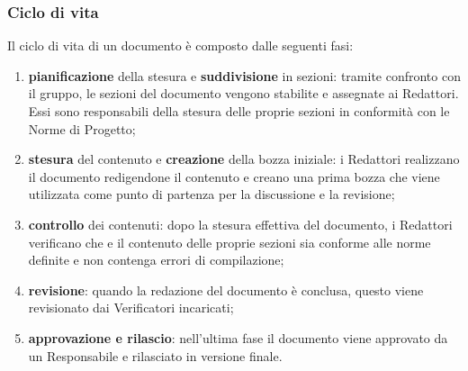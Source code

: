 \subsubsection{Ciclo di vita}
Il ciclo di vita di un documento è composto dalle seguenti fasi:
\begin{enumerate}
	\item \textbf{pianificazione} della stesura e \textbf{suddivisione} in sezioni: tramite confronto con il gruppo, le sezioni del documento vengono stabilite e assegnate ai Redattori. Essi sono responsabili della stesura delle proprie sezioni in conformità con le Norme di Progetto;
	\item \textbf{stesura} del contenuto e \textbf{creazione} della bozza iniziale: i Redattori realizzano il documento redigendone il contenuto e creano una prima bozza che viene utilizzata come punto di partenza per la discussione e la revisione;
	\item \textbf{controllo} dei contenuti: dopo la stesura effettiva del documento, i Redattori verificano che e il contenuto delle proprie sezioni sia conforme alle norme definite e non contenga errori di compilazione;
	\item \textbf{revisione}: quando la redazione del documento è conclusa, questo viene revisionato dai Verificatori incaricati;
	\item \textbf{approvazione e rilascio}: nell'ultima fase il documento viene approvato da un Responsabile e rilasciato in versione finale.
\end{enumerate}

